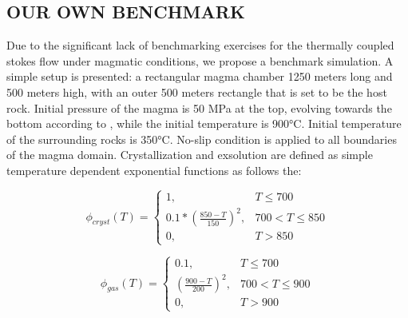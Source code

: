 \subsection{OUR OWN BENCHMARK}
Due to the significant lack of benchmarking exercises for the thermally coupled stokes flow under magmatic conditions, we propose a benchmark simulation. A simple setup is presented: a rectangular magma chamber 1250 meters long and 500 meters high, with an outer 500 meters rectangle that is set to be the host rock. Initial pressure of the magma is 50 MPa at the top, evolving towards the bottom according to  , while the initial temperature is 900°C. Initial temperature of the surrounding rocks is 350°C. No-slip condition is applied to all boundaries of the magma domain.  
Crystallization and exsolution are defined as simple temperature dependent exponential functions as follows the:


\begin{equation}   
	\phi_{cryst}(T) =
	\begin{cases} 
		1, & T \leq 700 \\
		0.1* \left(\frac{850 - T}{150} \right)^2, & 700 < T \leq 850 \\
		0, & T > 850
	\end{cases}
\end{equation}

\begin{equation}
	\phi_{gas}(T) =
	\begin{cases} 
		0.1, & T \leq 700 \\
		\left(\frac{900 - T}{200} \right)^2, & 700 < T \leq 900 \\
		0, & T > 900
	\end{cases}
\end{equation}

